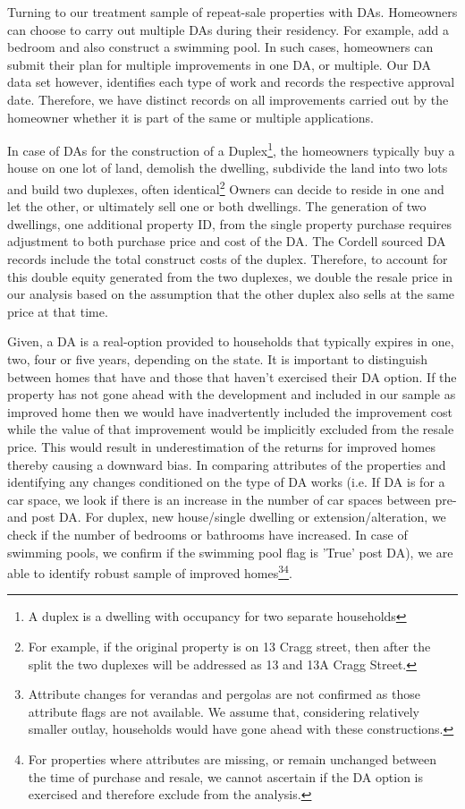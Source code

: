 \documentclass[AEJ,reqno, draftmode]{AEA} %
\begin{document}
Turning to our treatment sample of repeat-sale properties with DAs. Homeowners can choose to carry out multiple DAs during their residency. For example, add a bedroom and also construct a swimming pool. In such cases, homeowners can submit their plan for multiple improvements in one DA, or multiple. Our DA data set however, identifies each type of work and records the respective approval date. Therefore, we have distinct records on all improvements carried out by the homeowner whether it is part of the same or multiple applications.

In case of DAs for the construction of a Duplex\footnote{A duplex is a dwelling with occupancy for two separate households}, the homeowners typically buy a house on one lot of land, demolish the dwelling, subdivide the land into two lots and build two duplexes, often identical\footnote{For example, if the original property is on 13 Cragg street, then after the split the two duplexes will be addressed as 13 and 13A Cragg Street.} Owners can decide to reside in one and let the other, or ultimately sell one or both dwellings. The generation of two dwellings, one additional property ID, from the single property purchase requires adjustment to both purchase price and cost of the DA. The Cordell sourced DA records include the total construct costs of the duplex. Therefore, to account for this double equity generated from the two duplexes, we double the resale price in our analysis based on the assumption that the other duplex also sells at the same price at that time. 

Given, a DA is a real-option provided to households that typically expires in one, two, four or five years, depending on the state. It is important to distinguish between homes that have and those that haven't exercised their DA option. If the property has not gone ahead with the development and included in our sample as improved home then we would have inadvertently included the improvement cost while the value of that improvement would be implicitly excluded from the resale price. This would result in underestimation of the returns for improved homes thereby causing a downward bias. In comparing attributes of the properties and identifying any changes conditioned on the type of DA works (i.e. If DA is for a car space, we look if there is an increase in the number of car spaces between pre- and post DA. For duplex, new house/single dwelling or extension/alteration, we check if the number of bedrooms or bathrooms have increased. In case of swimming pools, we confirm if the swimming pool flag is 'True' post DA), we are able to identify robust sample of improved homes\footnote{Attribute changes for verandas and pergolas are not confirmed as those attribute flags are not available. We assume that, considering relatively smaller outlay, households would have gone ahead with these constructions.}\footnote{For properties where attributes are missing, or remain unchanged between the time of purchase and resale, we cannot ascertain if the DA option is exercised and therefore exclude from the analysis.}.
\end{document}
